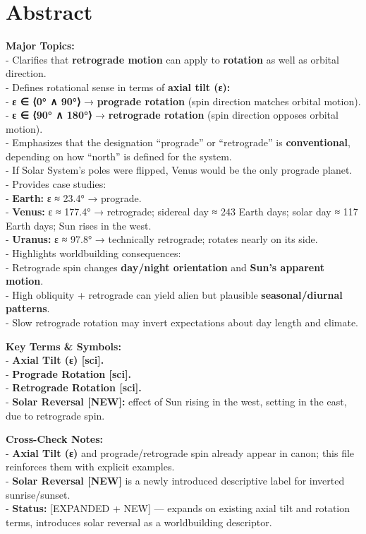 \documentclass[
  letterpaper,
]{book}
\begin{document}
\section{Abstract}\label{abstract-31}

\textbf{Major Topics:}\\
- Clarifies that \textbf{retrograde motion} can apply to
\textbf{rotation} as well as orbital direction.\\
- Defines rotational sense in terms of \textbf{axial tilt (ε):}\\
- \textbf{ε ∈ ⟨0° ∧ 90°⟩} → \textbf{prograde rotation} (spin direction
matches orbital motion).\\
- \textbf{ε ∈ ⟨90° ∧ 180°⟩} → \textbf{retrograde rotation} (spin
direction opposes orbital motion).\\
- Emphasizes that the designation ``prograde'' or ``retrograde'' is
\textbf{conventional}, depending on how ``north'' is defined for the
system.\\
- If Solar System's poles were flipped, Venus would be the only prograde
planet.\\
- Provides case studies:\\
- \textbf{Earth:} ε ≈ 23.4° → prograde.\\
- \textbf{Venus:} ε ≈ 177.4° → retrograde; sidereal day ≈ 243 Earth
days; solar day ≈ 117 Earth days; Sun rises in the west.\\
- \textbf{Uranus:} ε ≈ 97.8° → technically retrograde; rotates nearly on
its side.\\
- Highlights worldbuilding consequences:\\
- Retrograde spin changes \textbf{day/night orientation} and
\textbf{Sun's apparent motion}.\\
- High obliquity + retrograde can yield alien but plausible
\textbf{seasonal/diurnal patterns}.\\
- Slow retrograde rotation may invert expectations about day length and
climate.

\textbf{Key Terms \& Symbols:}\\
- \textbf{Axial Tilt (ε) {[}sci{]}.}\\
- \textbf{Prograde Rotation {[}sci{]}.}\\
- \textbf{Retrograde Rotation {[}sci{]}.}\\
- \textbf{Solar Reversal {[}NEW{]}:} effect of Sun rising in the west,
setting in the east, due to retrograde spin.

\textbf{Cross-Check Notes:}\\
- \textbf{Axial Tilt (ε)} and prograde/retrograde spin already appear in
canon; this file reinforces them with explicit examples.\\
- \textbf{Solar Reversal {[}NEW{]}} is a newly introduced descriptive
label for inverted sunrise/sunset.\\
- \textbf{Status:} {[}EXPANDED + NEW{]} --- expands on existing axial
tilt and rotation terms, introduces solar reversal as a worldbuilding
descriptor.
\end{document}
